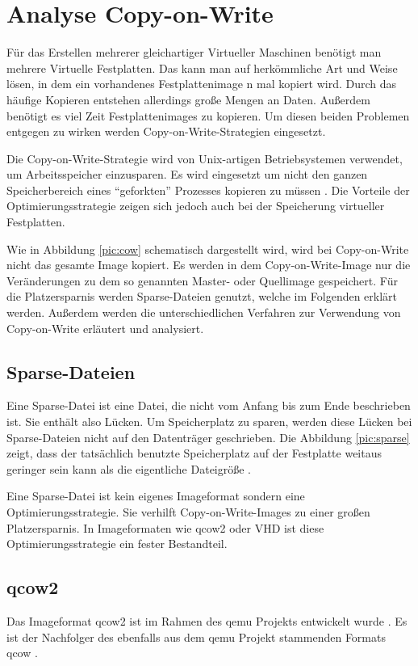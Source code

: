 \chapter{Analyse Copy-on-Write}
Für das Erstellen mehrerer gleichartiger Virtueller Maschinen benötigt man mehrere Virtuelle Festplatten. Das kann man auf herkömmliche Art und Weise lösen, in dem ein vorhandenes Festplattenimage n mal kopiert wird. Durch das häufige Kopieren entstehen allerdings große Mengen an Daten. Außerdem benötigt es viel Zeit Festplattenimages zu kopieren. Um diesen beiden Problemen entgegen zu wirken werden Copy-on-Write-Strategien eingesetzt.

Die Copy-on-Write-Strategie wird von Unix-artigen Betriebsystemen verwendet, um Arbeitsspeicher einzusparen. Es wird eingesetzt um nicht den ganzen Speicherbereich eines ``geforkten'' Prozesses kopieren zu müssen \cite{linuxcow}. Die Vorteile der Optimierungsstrategie zeigen sich jedoch auch bei der Speicherung virtueller Festplatten.

Wie in Abbildung \ref{pic:cow} schematisch dargestellt wird, wird bei Copy-on-Write nicht das gesamte Image kopiert. Es werden in dem Copy-on-Write-Image nur die Veränderungen zu dem so genannten Master- oder Quellimage gespeichert. Für die Platzersparnis werden Sparse-Dateien genutzt, welche im Folgenden erklärt werden. Außerdem werden die unterschiedlichen Verfahren zur Verwendung von Copy-on-Write erläutert und analysiert.

\section{Sparse-Dateien}
Eine Sparse-Datei ist eine Datei, die nicht vom Anfang bis zum Ende beschrieben ist. Sie enthält also Lücken. Um Speicherplatz zu sparen, werden diese Lücken bei Sparse-Dateien nicht auf den Datenträger geschrieben. Die Abbildung \ref{pic:sparse} zeigt, dass der tatsächlich benutzte Speicherplatz auf der Festplatte weitaus geringer sein kann als die eigentliche Dateigröße \cite{sparse}.


Eine Sparse-Datei ist kein eigenes Imageformat sondern eine Optimierungsstrategie. Sie verhilft Copy-on-Write-Images zu einer großen Platzersparnis. In Imageformaten wie qcow2 oder VHD ist diese Optimierungsstrategie ein fester Bestandteil. 

\section{qcow2}
Das Imageformat qcow2 ist im Rahmen des qemu Projekts entwickelt wurde \cite{qemuwiki}. Es ist der Nachfolger des ebenfalls aus dem qemu Projekt stammenden Formats qcow \cite{qcowmarkmc}.  

